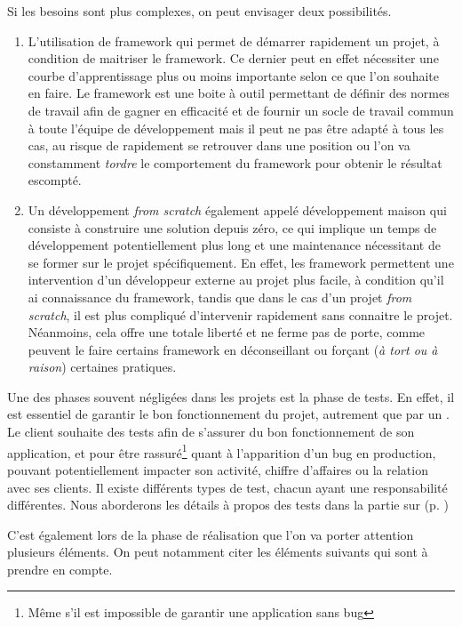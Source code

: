 Si les besoins sont plus complexes, on peut envisager deux possibilités.

\begin{enumerate}
	\item L'utilisation de \gls{framework} qui permet de démarrer rapidement un projet, à condition de maitriser le \gls{framework}. Ce dernier peut en effet nécessiter une courbe d'apprentissage plus ou moins importante selon ce que l'on souhaite en faire. Le \gls{framework} est une boite à outil permettant de définir des normes de travail afin de gagner en efficacité et de fournir un socle de travail commun à toute l'équipe de développement mais il peut ne pas être adapté à tous les cas, au risque de rapidement se retrouver dans une position ou l'on va constamment \emph{tordre} le comportement du \gls{framework} pour obtenir le résultat escompté.
	\item Un développement \emph{from scratch} également appelé développement maison qui consiste à construire une solution depuis zéro, ce qui implique un temps de développement potentiellement plus long et une maintenance nécessitant de se former sur le projet spécifiquement. En effet, les \gls{framework} permettent une intervention d'un développeur externe au projet plus facile, à condition qu'il ai connaissance du \gls{framework}, tandis que dans le cas d'un projet \emph{from scratch}, il est plus compliqué d'intervenir rapidement sans connaitre le projet. Néanmoins, cela offre une totale liberté et ne ferme pas de porte, comme peuvent le faire certains \gls{framework} en déconseillant ou forçant (\emph{à tort ou à raison}) certaines pratiques.
\end{enumerate}

Une des phases souvent négligées dans les projets est la phase de tests. En effet, il est essentiel de garantir le bon fonctionnement du projet, autrement que par un . Le client souhaite des tests afin de s'assurer du bon fonctionnement de son application, et pour être rassuré\footnote{Même s'il est impossible de garantir une application sans bug} quant à l'apparition d'un bug en production, pouvant potentiellement impacter son activité, chiffre d'affaires ou la relation avec ses clients. Il existe différents types de test, chacun ayant une responsabilité différentes. Nous aborderons les détails à propos des tests dans la partie sur  (p. \pageref{importance-test})

C'est également lors de la phase de réalisation que l'on va porter attention plusieurs éléments. On peut notamment citer les éléments suivants qui sont à prendre en compte.

